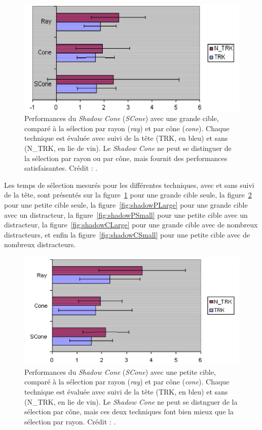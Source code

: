 	\begin{figure}[H]
		\centering
		\includegraphics[width=\textwidth]{figures/ch2/shadowSLarge}
		\caption[Performances du \emph{Shadow Cone} --- Grande cible]{Performances du \emph{Shadow Cone} (\emph{SCone}) avec une grande cible, comparé à la sélection par rayon (\emph{ray}) et par cône (\emph{cone}). Chaque technique est évaluée avec suivi de la tête (TRK, en bleu) et sans (N\_{}TRK, en lie de vin). Le \emph{Shadow Cone} ne peut se distinguer de la sélection par rayon ou par cône, mais fournit des performances satisfaisantes. Crédit : \cite{steed20043d}.}
		\label{fig:shadowSLarge}
	\end{figure}
	
	Les temps de sélection mesurés pour les différentes techniques, avec et sans suivi de la tête, sont présentés sur la figure~\ref{fig:shadowSLarge} pour une grande cible seule, la figure~\ref{fig:shadowSSmall} pour une petite cible seule, la figure~\ref{fig:shadowPLarge} pour une grande cible avec un distracteur, la figure~\ref{fig:shadowPSmall} pour une petite cible avec un distracteur, la figure~\ref{fig:shadowCLarge} pour une grande cible avec de nombreux distracteurs, et enfin la figure~\ref{fig:shadowCSmall} pour une petite cible avec de nombreux distracteurs.
	
	\begin{figure}[H]
		\centering
		\includegraphics[width=\textwidth]{figures/ch2/shadowSSmall}
		\caption[Performances du \emph{Shadow Cone} --- Petite cible]{Performances du \emph{Shadow Cone} (\emph{SCone}) avec une petite cible, comparé à la sélection par rayon (\emph{ray}) et par cône (\emph{cone}). Chaque technique est évaluée avec suivi de la tête (TRK, en bleu) et sans (N\_{}TRK, en lie de vin). Le \emph{Shadow Cone} ne peut se distnguer de la sélection par cône, mais ces deux techniques font bien mieux que la sélection par rayon. Crédit : \cite{steed20043d}.}
		\label{fig:shadowSSmall}
	\end{figure}
	
